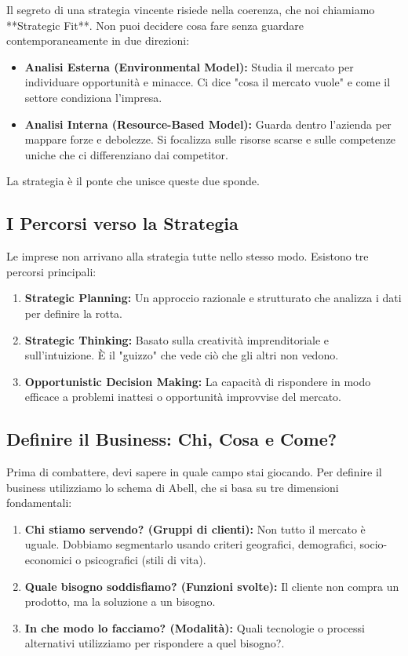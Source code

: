\documentclass[a4paper,10pt]{article}
\begin{document}
Il segreto di una strategia vincente risiede nella coerenza, che noi chiamiamo **Strategic Fit**. Non puoi decidere cosa fare senza guardare contemporaneamente in due direzioni:
\begin{itemize}
    \item \textbf{Analisi Esterna (Environmental Model):} Studia il mercato per individuare opportunità e minacce. Ci dice "cosa il mercato vuole" e come il settore condiziona l'impresa.
    \item \textbf{Analisi Interna (Resource-Based Model):} Guarda dentro l'azienda per mappare forze e debolezze. Si focalizza sulle risorse scarse e sulle competenze uniche che ci differenziano dai competitor.
\end{itemize}
La strategia è il ponte che unisce queste due sponde.

\subsection*{I Percorsi verso la Strategia}

Le imprese non arrivano alla strategia tutte nello stesso modo. Esistono tre percorsi principali:
\begin{enumerate}
    \item \textbf{Strategic Planning:} Un approccio razionale e strutturato che analizza i dati per definire la rotta.
    \item \textbf{Strategic Thinking:} Basato sulla creatività imprenditoriale e sull'intuizione. È il "guizzo" che vede ciò che gli altri non vedono.
    \item \textbf{Opportunistic Decision Making:} La capacità di rispondere in modo efficace a problemi inattesi o opportunità improvvise del mercato.
\end{enumerate}

\subsection*{Definire il Business: Chi, Cosa e Come?}

Prima di combattere, devi sapere in quale campo stai giocando. Per definire il business utilizziamo lo schema di Abell, che si basa su tre dimensioni fondamentali:
\begin{enumerate}
    \item \textbf{Chi stiamo servendo? (Gruppi di clienti):} Non tutto il mercato è uguale. Dobbiamo segmentarlo usando criteri geografici, demografici, socio-economici o psicografici (stili di vita).
    \item \textbf{Quale bisogno soddisfiamo? (Funzioni svolte):} Il cliente non compra un prodotto, ma la soluzione a un bisogno.
    \item \textbf{In che modo lo facciamo? (Modalità):} Quali tecnologie o processi alternativi utilizziamo per rispondere a quel bisogno?.
\end{enumerate}
\end{document}
